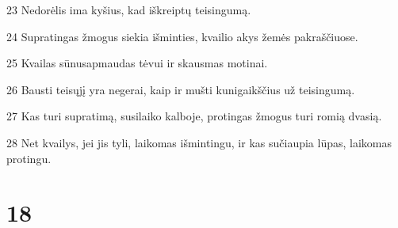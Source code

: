 \par 23 Nedorėlis ima kyšius, kad iškreiptų teisingumą. 
\par 24 Supratingas žmogus siekia išminties, kvailio akys žemės pakraščiuose. 
\par 25 Kvailas sūnus­apmaudas tėvui ir skausmas motinai. 
\par 26 Bausti teisųjį yra negerai, kaip ir mušti kunigaikščius už teisingumą. 
\par 27 Kas turi supratimą, susilaiko kalboje, protingas žmogus turi romią dvasią. 
\par 28 Net kvailys, jei jis tyli, laikomas išmintingu, ir kas sučiaupia lūpas, laikomas protingu.



\chapter{18}


